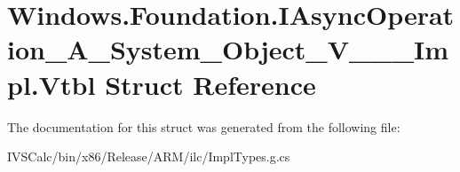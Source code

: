 \hypertarget{struct_windows_1_1_foundation_1_1_i_async_operation___a___system___object___v_______impl_1_1_vtbl}{}\section{Windows.\+Foundation.\+I\+Async\+Operation\+\_\+\+A\+\_\+\+System\+\_\+\+Object\+\_\+\+V\+\_\+\+\_\+\+\_\+\+Impl.\+Vtbl Struct Reference}
\label{struct_windows_1_1_foundation_1_1_i_async_operation___a___system___object___v_______impl_1_1_vtbl}


The documentation for this struct was generated from the following file\+:\begin{DoxyCompactItemize}
\item 
I\+V\+S\+Calc/bin/x86/\+Release/\+A\+R\+M/ilc/Impl\+Types.\+g.\+cs\end{DoxyCompactItemize}
